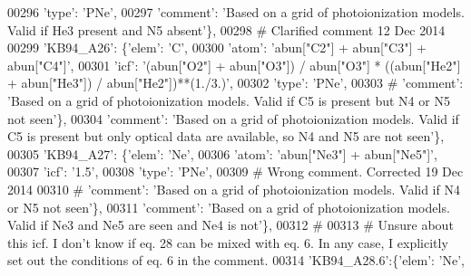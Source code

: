 \begin{DoxyCode}
00296                                       \textcolor{stringliteral}{'type'}: \textcolor{stringliteral}{'PNe'},
00297                                       \textcolor{stringliteral}{'comment'}: \textcolor{stringliteral}{'Based on a grid of photoionization models. Valid if He3
       present and N5 absent'}\},
00298 \textcolor{comment}{# Clarified comment 12 Dec 2014}
00299                          \textcolor{stringliteral}{'KB94\_A26'}: \{\textcolor{stringliteral}{'elem'}: \textcolor{stringliteral}{'C'},
00300                                       \textcolor{stringliteral}{'atom'}: \textcolor{stringliteral}{'abun["C2"] + abun["C3"] + abun["C4"]'},
00301                                       \textcolor{stringliteral}{'icf'}: \textcolor{stringliteral}{'(abun["O2"] + abun["O3"]) / abun["O3"] * ((abun["He2"] +
       abun["He3"]) / abun["He2"])**(1./3.)'},
00302                                       \textcolor{stringliteral}{'type'}: \textcolor{stringliteral}{'PNe'},
00303 \textcolor{comment}{#                                      'comment': 'Based on a grid of photoionization models. Valid if C5
       is present but N4 or N5 not seen'\},}
00304                                       \textcolor{stringliteral}{'comment'}: \textcolor{stringliteral}{'Based on a grid of photoionization models. Valid if C5 is
       present but only optical data are available, so N4 and N5 are not seen'}\},
00305                          \textcolor{stringliteral}{'KB94\_A27'}: \{\textcolor{stringliteral}{'elem'}: \textcolor{stringliteral}{'Ne'},
00306                                       \textcolor{stringliteral}{'atom'}: \textcolor{stringliteral}{'abun["Ne3"] + abun["Ne5"]'},
00307                                       \textcolor{stringliteral}{'icf'}: \textcolor{stringliteral}{'1.5'},
00308                                       \textcolor{stringliteral}{'type'}: \textcolor{stringliteral}{'PNe'},
00309 \textcolor{comment}{# Wrong comment. Corrected 19 Dec 2014}
00310 \textcolor{comment}{#                                      'comment': 'Based on a grid of photoionization models. Valid if N4
       or N5 not seen'\},}
00311                                       \textcolor{stringliteral}{'comment'}: \textcolor{stringliteral}{'Based on a grid of photoionization models. Valid if Ne3
       and Ne5 are seen and Ne4 is not'}\},
00312 \textcolor{comment}{#}
00313 \textcolor{comment}{# Unsure about this icf. I don't know if eq. 28 can be mixed with eq. 6. In any case, I explicitly set out
       the conditions of eq. 6 in the comment.}
00314                          \textcolor{stringliteral}{'KB94\_A28.6'}:\{\textcolor{stringliteral}{'elem'}: \textcolor{stringliteral}{'Ne'},

\end{DoxyCode}
